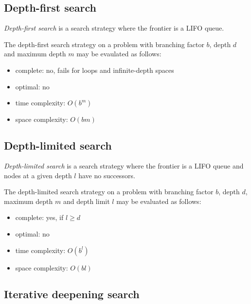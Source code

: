 \documentclass{article}
\begin{document}
\subsection{Depth-first search}

\begin{definition}
    \emph{Depth-first search} is a search strategy where the frontier is
    a LIFO queue.
\end{definition}

\begin{theorem}
    The depth-first search strategy on a problem with branching factor $b$,
    depth $d$ and maximum depth $m$ may be evaulated as follows:
    \begin{itemize}
        \item complete: no, fails for loops and infinite-depth spaces
        \item optimal: no
        \item time complexity: $O(b^m)$ 
        \item space complexity: $O(bm)$
    \end{itemize}
\end{theorem}

\subsection{Depth-limited search}

\begin{definition}
    \emph{Depth-limited search} is a search strategy where the frontier is
    a LIFO queue and nodes at a given depth $l$ have no successors.
\end{definition}

\begin{theorem}
    The depth-limited search strategy on a problem with branching factor $b$,
    depth $d$, maximum depth $m$ and depth limit $l$ may be evaluated as follows:
    \begin{itemize}
        \item complete: yes, if $l\geq d$
        \item optimal: no
        \item time complexity: $O(b^l)$
        \item space complexity: $O(bl)$
    \end{itemize}
\end{theorem}

\subsection{Iterative deepening search}
\end{document}
